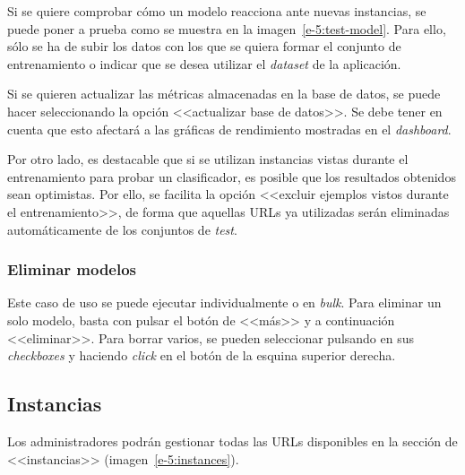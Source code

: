 Si se quiere comprobar cómo un modelo reacciona ante nuevas instancias, se puede poner a prueba como se muestra en la imagen~\ref{e-5:test-model}. Para ello, sólo se ha de subir los datos con los que se quiera formar el conjunto de entrenamiento o indicar que se desea utilizar el \textit{dataset} de la aplicación.

Si se quieren actualizar las métricas almacenadas en la base de datos, se puede hacer seleccionando la opción <<actualizar base de datos>>. Se debe tener en cuenta que esto afectará a las gráficas de rendimiento mostradas en el \textit{dashboard}.

Por otro lado, es destacable que si se utilizan instancias vistas durante el entrenamiento para probar un clasificador, es posible que los resultados obtenidos sean optimistas. Por ello, se facilita la opción <<excluir ejemplos vistos durante el entrenamiento>>, de forma que aquellas URLs ya utilizadas serán eliminadas automáticamente de los conjuntos de \textit{test}.

\subsubsection{Eliminar modelos}

Este caso de uso se puede ejecutar individualmente o en \textit{bulk}. Para eliminar un solo modelo, basta con pulsar el botón de <<más>> y a continuación <<eliminar>>. Para borrar varios, se pueden seleccionar pulsando en sus \textit{checkboxes} y haciendo \textit{click} en el botón de la esquina superior derecha.

\subsection{Instancias}
\label{s-e:instances}

Los administradores podrán gestionar todas las URLs disponibles en la sección de <<instancias>> (imagen~\ref{e-5:instances}).

